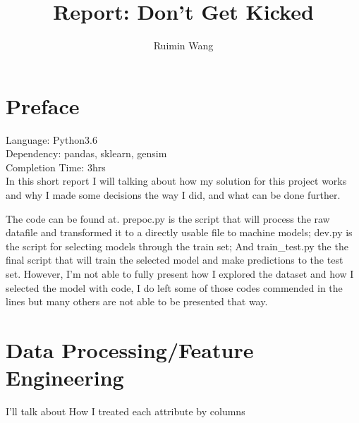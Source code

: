 \documentclass[a4paper]{article}
\title{Report: Don't Get Kicked}
\author{Ruimin Wang}
\date{}
\begin{document}
\maketitle

\section{Preface}
Language: Python3.6\\
Dependency: pandas, sklearn, gensim\\
Completion Time: 3hrs\\

In this short report I will talking about how my solution for this project works and why I made some decisions the way I did, and what can be done further.

The code can be found at. prepoc.py is the script that will process the raw datafile and transformed it to a directly usable file to machine models; dev.py is the script for selecting models through the train set; And train\_test.py the the final script that will train the selected model and make predictions to the test set. However, I'm not able to fully present how I explored the dataset and how I selected the model with code, I do left some of those codes commended in the lines but many others are not able to be presented that way.

\section{Data Processing/Feature Engineering}

I'll talk about How I treated each attribute by columns
\end{document}
